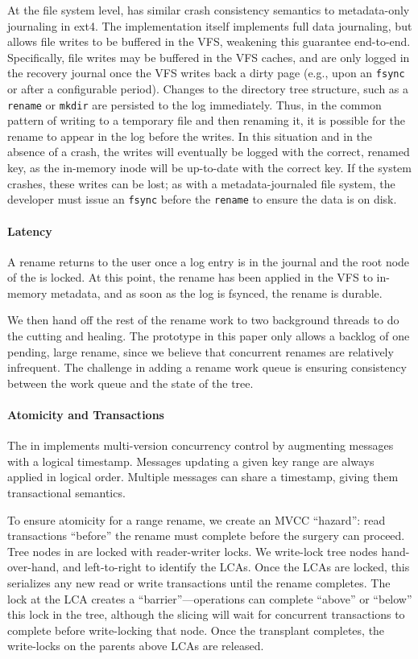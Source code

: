 At the file system level, \betrfs has similar crash consistency semantics to
metadata-only journaling in ext4.
The \bet implementation itself implements full data journaling, but \betrfs
allows file writes to be buffered in the VFS, weakening this guarantee
end-to-end.
Specifically, file writes may be buffered in the VFS caches, and are only logged
in the recovery journal once the VFS writes back a dirty page (e.g., upon an
{\tt fsync} or after a configurable period).
Changes to the directory tree structure, such as a {\tt rename} or {\tt mkdir}
are persisted to the log immediately.
Thus, in the common pattern of writing to a temporary file and then renaming it,
it is possible for the rename to appear in the log before the writes.
In this situation and in the absence of a crash, the writes will eventually be
logged with the correct, renamed key, as the in-memory inode will be up-to-date
with the correct \bet key.
If the system crashes, these writes can be lost; as with a metadata-journaled
file system, the developer must issue an {\tt fsync} before the {\tt rename} to
ensure the data is on disk.

\paragraph{Latency} A rename returns to the user once a log entry is in the
journal and the root node of the \bet is locked.
At this point, the rename has been applied in the VFS to in-memory metadata,
and as soon as the log is fsynced, the rename is durable.

We then hand off the rest of the rename work to two background threads
to do the cutting and healing.
The prototype in this paper only allows a backlog of one pending, large rename,
since we believe that concurrent renames are relatively infrequent.
The challenge in adding a rename work queue is ensuring consistency between the
work queue and the state of the tree.

\paragraph{Atomicity and Transactions}
The \bet in \betrfs implements multi-version concurrency control by augmenting
messages with a logical timestamp.
Messages updating a given key range are always applied in logical order.
Multiple messages can share a timestamp, giving them transactional semantics.

To ensure atomicity for a range rename, we create an MVCC ``hazard'':
read transactions ``before'' the rename must complete before the surgery
can proceed.
Tree nodes in \betrfs  are locked with reader-writer locks.
We write-lock tree nodes hand-over-hand, and left-to-right to identify
the LCAs.  Once the LCAs are locked, this serializes any new read or write
transactions until the rename completes.  The lock at the LCA creates
a ``barrier''---operations can complete ``above'' or ``below'' this lock
in the tree, although the slicing will wait for concurrent
transactions to complete before write-locking that node. Once the transplant
completes, the write-locks on the parents above LCAs are released.

